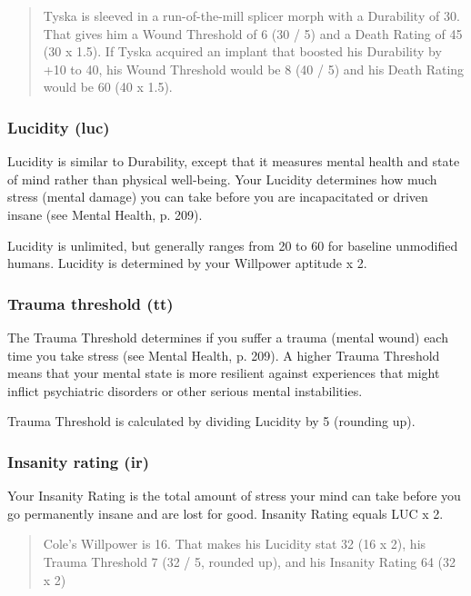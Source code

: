 \begin{quotation} Tyska is sleeved in a run-of-the-mill splicer morph with a Durability of 30. That gives him a Wound Threshold of 6 (30 / 5) and a Death Rating of 45 (30 x 1.5). If Tyska acquired an implant that boosted his Durability by +10 to 40, his Wound Threshold would be 8 (40 / 5) and his Death Rating would be 60 (40 x 1.5). \end{quotation} 

\subsubsection{Lucidity (luc)} \label{sec:lucidity-luc} 

Lucidity is similar to Durability, except that it measures mental health and state of mind rather than physical well-being. Your Lucidity determines how much stress (mental damage) you can take before you are incapacitated or driven insane (see Mental Health, p. 209). 

Lucidity is unlimited, but generally ranges from 20 to 60 for baseline unmodified humans. Lucidity is determined by your Willpower aptitude x 2. 

\subsubsection{Trauma threshold (tt)} \label{sec:trauma-threshold-tt} 

The Trauma Threshold determines if you suffer a trauma (mental wound) each time you take stress (see Mental Health, p. 209). A higher Trauma Threshold means that your mental state is more resilient against experiences that might inflict psychiatric disorders or other serious mental instabilities. 

Trauma Threshold is calculated by dividing Lucidity by 5 (rounding up). 

\subsubsection{Insanity rating (ir)} \label{sec:insanity-rating-ir} 

Your Insanity Rating is the total amount of stress your mind can take before you go permanently insane and are lost for good. Insanity Rating equals LUC x 2. 

\begin{quotation} Cole's Willpower is 16. That makes his Lucidity stat 32 (16 x 2), his Trauma Threshold 7 (32 / 5, rounded up), and his Insanity Rating 64 (32 x 2) \end{quotation} 

